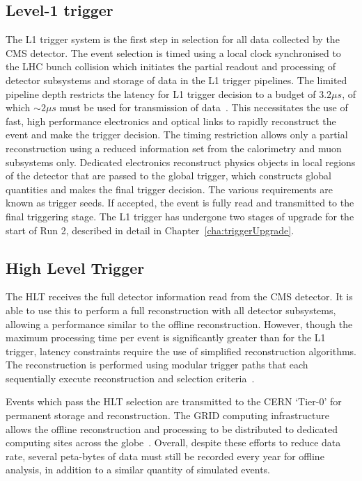 \subsection{Level-1 trigger}

The L1 trigger system is the first step in selection for all data collected by the CMS detector. The event selection 
is timed using a local clock synchronised to the LHC bunch collision which initiates the partial readout and processing of 
detector subsystems and storage of data in the L1 trigger pipelines. The limited pipeline depth restricts the latency for L1 trigger decision to a budget of $3.2\mu s$,
of which $\sim2\mu s$ must be used for transmission of data~\cite{daq_performance}. This necessitates the use of fast, high performance electronics
and optical links to rapidly reconstruct the event and make the trigger decision. The timing restriction allows only 
a partial reconstruction using a reduced information set from the calorimetry and muon subsystems only. Dedicated electronics
reconstruct physics objects in local regions of the detector that are passed to the global trigger, which constructs global
quantities and makes the final trigger decision. The various requirements are known as trigger seeds. 
If accepted, the event is fully read and transmitted to the final triggering
stage. The L1 trigger has undergone two stages of upgrade for the start of Run 2, described in detail in Chapter~\ref{cha:triggerUpgrade}.

\subsection{High Level Trigger}

The HLT receives the full detector information read from the CMS detector. It is able to use this to perform 
a full reconstruction with all detector subsystems, allowing a performance similar to the offline reconstruction. However, 
though the maximum processing time per event is significantly greater than for the L1 trigger, latency constraints 
require the use of simplified reconstruction algorithms. The reconstruction is performed using modular trigger paths
that each sequentially execute reconstruction and selection criteria~\cite{daq_performance}. 

Events which pass the HLT selection are transmitted to the CERN `Tier-0' for permanent storage and reconstruction. 
The GRID computing infrastructure allows the offline reconstruction and processing to be distributed to dedicated 
computing sites across the globe~\cite{grid_tdr}. Overall, despite these efforts to reduce data rate, 
several peta-bytes of data must still be recorded every year for offline analysis, in addition to 
a similar quantity of simulated events.

